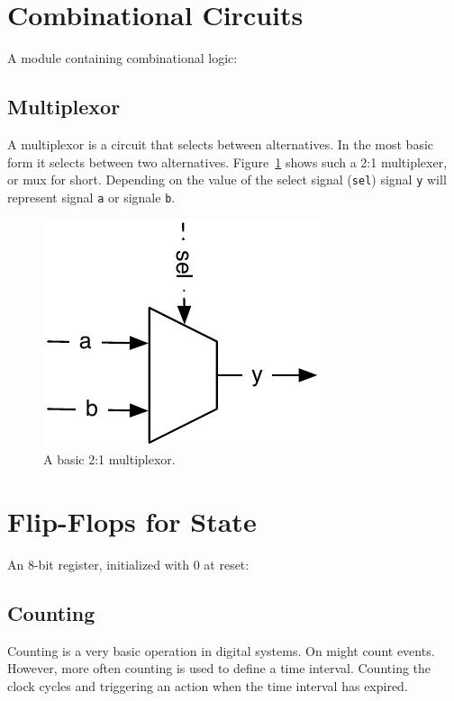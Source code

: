 \documentclass[%
    10pt, %
    headinclude, footexclude,
    openright, %
    notitlepage,
    cleardoubleempty,
    headsepline,
    pointlessnumbers,
    bibtotoc, idxtotoc,
    ]{scrbook}
\newcommand{\code}[1]{{\small{\texttt{#1}}}}
\begin{document}
\section{Combinational Circuits}

A module containing combinational logic:



\subsection{Multiplexor}

A multiplexor is a circuit that selects between alternatives. In the most
basic form it selects between two alternatives. Figure~\ref{fig:mux} shows
such a 2:1 multiplexer, or mux for short. Depending on the value of the
select signal (\code{sel}) signal \code{y} will represent signal \code{a} or
signale \code{b}.

\begin{figure}
  \centering
  \includegraphics{figures/mux}

  \caption{A basic 2:1 multiplexor.}
  \label{fig:mux}
\end{figure}

\section{Flip-Flops for State}

An 8-bit register, initialized with 0 at reset:



\subsection{Counting}

Counting is a very basic operation in digital systems. On might count events.
However, more often counting is used to define a time interval. Counting the
clock cycles and triggering an action when the time interval has expired.
\end{document}
